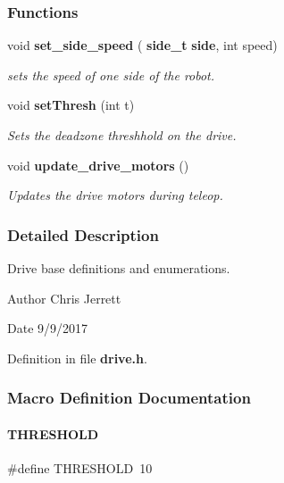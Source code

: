 \subsubsection*{Functions}
\begin{DoxyCompactItemize}
\item 
void \textbf{ set\+\_\+side\+\_\+speed} (\textbf{ side\+\_\+t} \textbf{ side}, int speed)
\begin{DoxyCompactList}\small\item\em sets the speed of one side of the robot. \end{DoxyCompactList}\item 
void \textbf{ set\+Thresh} (int t)
\begin{DoxyCompactList}\small\item\em Sets the deadzone threshhold on the drive. \end{DoxyCompactList}\item 
void \textbf{ update\+\_\+drive\+\_\+motors} ()
\begin{DoxyCompactList}\small\item\em Updates the drive motors during teleop. \end{DoxyCompactList}\end{DoxyCompactItemize}


\subsubsection{Detailed Description}
Drive base definitions and enumerations. 

\begin{DoxyAuthor}{Author}
Chris Jerrett 
\end{DoxyAuthor}
\begin{DoxyDate}{Date}
9/9/2017 
\end{DoxyDate}


Definition in file \textbf{ drive.\+h}.



\subsubsection{Macro Definition Documentation}
\mbox{\label{a00014_a4679d8ea8690999a6c6c7c0cb245c879}} 
\paragraph{T\+H\+R\+E\+S\+H\+O\+LD}
{\footnotesize\ttfamily \#define T\+H\+R\+E\+S\+H\+O\+LD~10}



